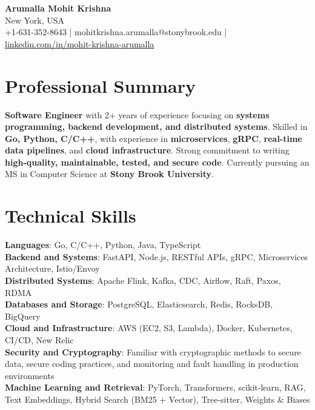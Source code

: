 \documentclass[letterpaper,11pt]{article}
\begin{document}
\begin{center}
  {\Large \textbf{Arumalla Mohit Krishna}} \\
  New York, USA \\
  +1-631-352-8643 \enspace | \enspace mohitkrishna.arumalla@stonybrook.edu \enspace | \enspace \href{https://www.linkedin.com/in/mohit-krishna-arumalla}{linkedin.com/in/mohit-krishna-arumalla}
\end{center}

\section{Professional Summary}
  \begin{itemize}[leftmargin=0.15in, label={}]
    \small{\item{
     \textbf{Software Engineer} with 2+ years of experience focusing on \textbf{systems programming, backend development, and distributed systems}. Skilled in \textbf{Go, Python, C/C++}, with experience in \textbf{microservices}, \textbf{gRPC}, \textbf{real-time data pipelines}, and \textbf{cloud infrastructure}. Strong commitment to writing \textbf{high-quality, maintainable, tested, and secure code}. Currently pursuing an MS in Computer Science at \textbf{Stony Brook University}.
    }}
  \end{itemize}
\vspace{-16pt}

\section{Technical Skills}
 \begin{itemize}[leftmargin=0.15in, label={}]
    \small{\item{
     \textbf{Languages}: Go, C/C++, Python, Java, TypeScript \\
     \textbf{Backend and Systems}: FastAPI, Node.js, RESTful APIs, gRPC, Microservices Architecture, Istio/Envoy \\
     \textbf{Distributed Systems}: Apache Flink, Kafka, CDC, Airflow, Raft, Paxos, RDMA \\
     \textbf{Databases and Storage}: PostgreSQL, Elasticsearch, Redis, RocksDB, BigQuery \\
     \textbf{Cloud and Infrastructure}: AWS (EC2, S3, Lambda), Docker, Kubernetes, CI/CD, New Relic \\
     \textbf{Security and Cryptography}: Familiar with cryptographic methods to secure data, secure coding practices, and monitoring and fault handling in production environments \\
     \textbf{Machine Learning and Retrieval}: PyTorch, Transformers, scikit-learn, RAG, Text Embeddings, Hybrid Search (BM25 + Vector), Tree-sitter, Weights \& Biases
    }}
 \end{itemize}
\vspace{-16pt}
\end{document}
